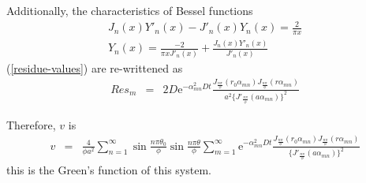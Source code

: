 \documentclass{article}
\begin{document}
Additionally, the characteristics of Bessel functions
\begin{eqnarray}
    J_n(x)Y'_n(x) - J'_n(x)Y_n(x) = \frac{2}{\pi x} \nonumber \\
    Y_n(x) = \frac{-2}{\pi xJ'_n(x)} + \frac{J_n(x)Y'_n(x)}{J'_n(x)}
\end{eqnarray}
(\ref{residue-values}) are re-writtened as
\begin{eqnarray}
%
    Res_m &=& 2D\mathrm{e}^{-\alpha_{mn}^2Dt}
    \frac{J_{\frac{n\pi}{\phi}}(r_0\alpha_{mn})
          J_{\frac{n\pi}{\phi}}(r\alpha_{mn})}
         {a^2\{J'_{\frac{n\pi}{\phi}}(a\alpha_{mn})\}^2}
    \label{residue-values-only-J}
\end{eqnarray}

Therefore, $v$ is
\begin{eqnarray}
    v &=& \frac{4}{\phi a^2}\sum^{\infty}_{n=1}
          \sin\frac{n\pi\theta_0}{\phi}\sin\frac{n\pi\theta}{\phi}
          \sum^{\infty}_{m=1}\mathrm{e}^{-\alpha_{mn}^2Dt}
          \frac{J_{\frac{n\pi}{\phi}}(r_0\alpha_{mn})
                J_{\frac{n\pi}{\phi}}(r\alpha_{mn})}
          {\{J'_{\frac{n\pi}{\phi}}(a\alpha_{mn})\}^2}
    \label{v-complete}
\end{eqnarray}
this is the Green's function of this system.
\end{document}
